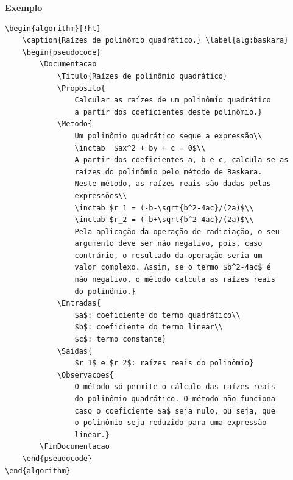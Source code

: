 \documentclass[a4paper,12pt,oneside,onecolumn,final,fleqn]{repUERJ}
\begin{document}
\noindent\textbf{Exemplo}
\begin{verbatim}
\begin{algorithm}[!ht]
    \caption{Raízes de polinômio quadrático.} \label{alg:baskara}
    \begin{pseudocode}
        \Documentacao
            \Titulo{Raízes de polinômio quadrático}
            \Proposito{
                Calcular as raízes de um polinômio quadrático 
                a partir dos coeficientes deste polinômio.}
            \Metodo{
                Um polinômio quadrático segue a expressão\\
                \inctab  $ax^2 + by + c = 0$\\
                A partir dos coeficientes a, b e c, calcula-se as
                raízes do polinômio pelo método de Baskara.
                Neste método, as raízes reais são dadas pelas 
                expressões\\
                \inctab $r_1 = (-b-\sqrt{b^2-4ac}/(2a)$\\
                \inctab $r_2 = (-b+\sqrt{b^2-4ac}/(2a)$\\
                Pela aplicação da operação de radiciação, o seu 
                argumento deve ser não negativo, pois, caso
                contrário, o resultado da operação seria um 
                valor complexo. Assim, se o termo $b^2-4ac$ é
                não negativo, o método calcula as raízes reais
                do polinômio.}
            \Entradas{
                $a$: coeficiente do termo quadrático\\
                $b$: coeficiente do termo linear\\
                $c$: termo constante}
            \Saidas{
                $r_1$ e $r_2$: raízes reais do polinômio}
            \Observacoes{
                O método só permite o cálculo das raízes reais
                do polinômio quadrático. O método não funciona 
                caso o coeficiente $a$ seja nulo, ou seja, que 
                o polinômio seja reduzido para uma expressão 
                linear.}
        \FimDocumentacao
    \end{pseudocode}
\end{algorithm}
\end{verbatim}
\end{document}
